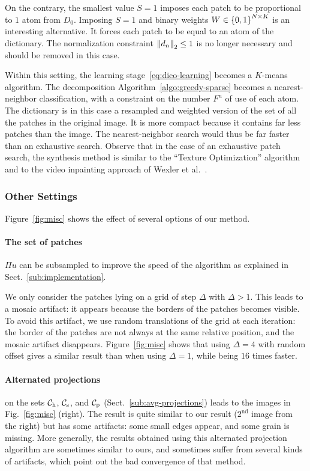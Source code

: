 On the contrary, the smallest value $S=1$ imposes each patch to be proportional to $1$ atom from $D_0$.
Imposing $S=1$ and binary weights $W\in\left\{0,1\right\}^{N\times K}$ is an interesting alternative.
It forces each patch to be equal to an atom of the dictionary.
The normalization constraint $\left\|d_n\right\|_2\leq1$ is no longer necessary and should be removed in this case.

Within this setting, the learning stage~\eqref{eq:dico-learning} becomes a $K$-means algorithm.
The decomposition Algorithm~\ref{algo:greedy-sparse} becomes a nearest-neighbor classification, with a constraint on the number $F^n$ of use of each atom.
The dictionary is in this case a resampled and weighted version of the set of all the patches in the original image.
It is more compact because it contains far less patches than the image.
The nearest-neigh\-bor search would thus be far faster than an exhaustive search.
Observe that in the case of an exhaustive patch search, the synthesis method is similar to the ``Texture Optimization'' algorithm~\cite{kwatra2005texture} and to the video inpainting approach of Wexler et al.~\cite{wexler2004space}.


\subsubsection{Other Settings}

Figure~\ref{fig:misc} shows the effect of several options of our method.


\paragraph{The set of patches} $\Pi u$ can be subsampled to improve the speed of the algorithm as explained in Sect.~\ref{sub:implementation}.

We only consider the patches lying on a grid of step $\Delta$ with $\Delta>1$.
This leads to a mosaic artifact: it appears because the borders of the patches becomes visible.
To avoid this artifact, we use random translations of the grid at each iteration: the border of the patches are not always at the same relative position, and the mosaic artifact disappears.
Figure~\ref{fig:misc} shows that using $\Delta=4$ with random offset gives a similar result than when using $\Delta=1$, while being $16$ times faster.

\paragraph{Alternated projections} on the sets ${\mathcal{C}_{\mathrm{h}}}$, ${\mathcal{C}_{\mathrm{s}}}$, and ${\mathcal{C}_{\mathrm{p}}}$ (Sect.~\ref{sub:avg-projections}) leads to the images in Fig.~\ref{fig:misc} (right).
The result is quite similar to our result ($2^\text{nd}$ image from the right) but has some artifacts: some small edges appear, and some grain is missing.
More generally, the results obtained using this alternated projection algorithm are sometimes similar to ours, and sometimes suffer from several kinds of artifacts, which point out the bad convergence of that method.

